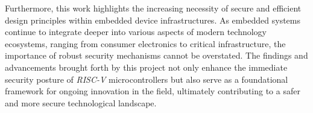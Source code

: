 Furthermore, this work highlights the increasing necessity of secure and efficient
design principles within embedded device infrastructures. As embedded systems
continue to integrate deeper into various aspects of modern technology
ecosystems, ranging from consumer electronics to critical infrastructure, the
importance of robust security mechanisms cannot be overstated. The findings and advancements
brought forth by this project not only enhance the immediate security posture of
\textit{RISC-V} microcontrollers but also serve as a foundational framework for
ongoing innovation in the field, ultimately contributing to a safer and more secure
technological landscape.